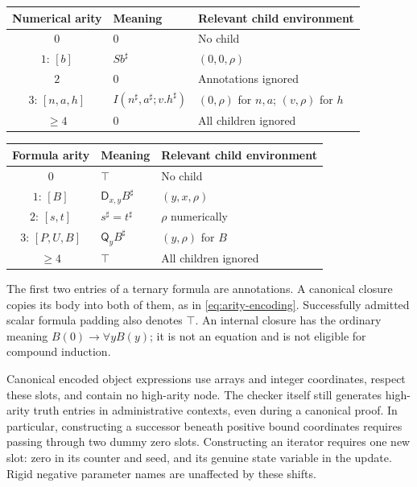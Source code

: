 \documentclass[11pt,letterpaper]{article}
\theoremstyle{definition}\newtheorem{definition}[theorem]{Definition}
\theoremstyle{remark}\newtheorem{remark}[theorem]{Remark}
\newcommand{\D}{\mathsf D}
\newcommand{\Q}{\mathsf Q}
\begin{document}
\begin{center}
\begin{tabular}{cll}
\toprule
Numerical arity & Meaning & Relevant child environment\\
\midrule
$0$ & $0$ & No child\\
$1$: $[b]$ & $Sb^\sharp$ & $(0,0,\rho)$\\
$2$ & $0$ & Annotations ignored\\
$3$: $[n,a,h]$ & $I(n^\sharp,a^\sharp;v.h^\sharp)$ & $(0,\rho)$ for $n,a$; $(v,\rho)$ for $h$\\
$\geq4$ & $0$ & All children ignored\\
\bottomrule
\end{tabular}
\end{center}

\begin{center}
\begin{tabular}{cll}
\toprule
Formula arity & Meaning & Relevant child environment\\
\midrule
$0$ & $\top$ & No child\\
$1$: $[B]$ & $\D_{x,y}B^\sharp$ & $(y,x,\rho)$\\
$2$: $[s,t]$ & $s^\sharp=t^\sharp$ & $\rho$ numerically\\
$3$: $[P,U,B]$ & $\Q_yB^\sharp$ & $(y,\rho)$ for $B$\\
$\geq4$ & $\top$ & All children ignored\\
\bottomrule
\end{tabular}
\end{center}

The first two entries of a ternary formula are annotations.  A canonical
closure copies its body into both of them, as in
\eqref{eq:arity-encoding}.  Successfully admitted scalar formula padding
also denotes $\top$.  An internal closure has the ordinary meaning
$B(0)\to\forall yB(y)$; it is not an equation and is not eligible for
compound induction.

Canonical encoded object expressions use arrays and integer coordinates,
respect these slots, and contain no high-arity node.  The checker itself
still generates high-arity truth entries in administrative contexts,
even during a canonical proof.  In particular, constructing a
successor beneath positive bound coordinates requires passing through
two dummy zero slots.  Constructing an iterator requires one new slot:
zero in its counter and seed, and its genuine state variable in the
update.  Rigid negative parameter names are unaffected by these shifts.
\end{document}
